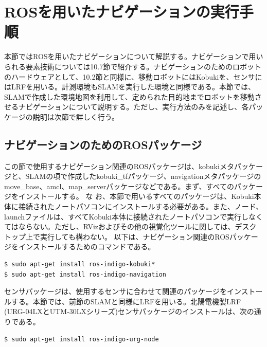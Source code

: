 \section{ROSを用いたナビゲーションの実行手順}

本節ではROSを用いたナビゲーションについて解説する。ナビゲーションで用いられる要素技術については10.7節で紹介する。ナビゲーションのためのロボットのハードウェアとして、10.2節と同様に、移動ロボットにはKobukiを、センサにはLRFを用いる。計測環境もSLAMを実行した環境と同様である。本節では、SLAMで作成した環境地図を利用して、定められた目的地までロボットを移動させるナビゲーションについて説明する。ただし、実行方法のみを記述し、各パッケージの説明は次節で詳しく行う。

\subsection{ナビゲーションのためのROSパッケージ}

この節で使用するナビゲーション関連のROSパッケージは、kobukiメタパッケージと、SLAMの項で作成したkobuki\_tfパッケージ、navigationメタパッケージのmove\_base、amcl、map\_serverパッケージなどである。まず、すべてのパッケージをインストールする。 な お、本節で用いるすべてのパッケージは、Kobuki本体に接続されたノートパソコンにインストールする必要がある。また、ノード、launchファイルは、すべてKobuki本体に接続されたノートパソコンで実行しなくてはならない。ただし、RVizおよびその他の視覚化ツールに関しては、デスクトップ上で実行しても構わない。
以下は、ナビゲーション関連のROSパッケージをインストールするためのコマンドである。

\begin{lstlisting}[language=ROS]
$ sudo apt-get install ros-indigo-kobuki*
$ sudo apt-get install ros-indigo-navigation
\end{lstlisting}

センサパッケージは、使用するセンサに合わせて関連のパッケージをインストールする。本節では、前節のSLAMと同様にLRFを用いる。北陽電機製LRF (URG-04LXとUTM-30LXシリーズ)センサパッケージのインストールは、次の通りである。

\begin{lstlisting}[language=ROS]
$ sudo apt-get install ros-indigo-urg-node
\end{lstlisting}

